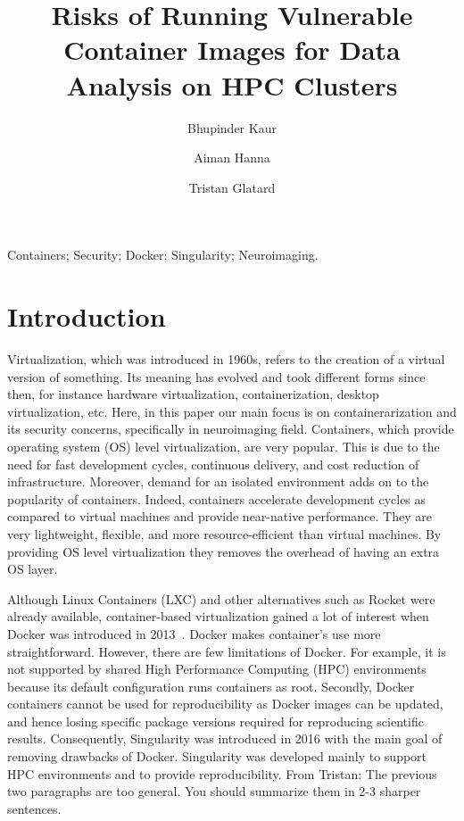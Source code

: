 \documentclass[a4paper,num-refs]{oup-contemporary}
\title{Risks of Running Vulnerable Container Images for Data Analysis on HPC
Clusters}
\newcommand{\TG}[1]{\color{blue}From Tristan: #1\color{black}}
\begin{document}
\author[1]{Bhupinder Kaur}
\author[1]{Aiman Hanna}
\author[1]{Tristan Glatard}


\maketitle

\begin{keywords}
Containers; Security; Docker; Singularity; Neuroimaging.
\end{keywords}


\section{Introduction}

Virtualization, which was introduced in 1960s, refers to the creation of a virtual
version of something. Its meaning has evolved and took different forms since then, for
instance hardware virtualization, containerization, desktop virtualization, etc.
Here, in this paper our main focus is on containerarization and its security concerns,
specifically in neuroimaging field.
Containers, which provide operating system (OS) level virtualization, are very
popular. This is due to the need for fast development cycles, continuous delivery,
and cost reduction of infrastructure. Moreover, demand for an isolated
environment adds on to the popularity of containers. Indeed, containers accelerate
development cycles as compared to virtual machines and provide near-native performance.
They are very lightweight, flexible, and more resource-efficient than virtual
machines. By providing OS level virtualization they
removes the overhead of having an extra OS layer.

Although Linux Containers (LXC) and other alternatives such as Rocket were already
available, container-based virtualization gained a lot of interest when Docker was
introduced in 2013~\cite{gantikow2016providing}. Docker makes container's use more straightforward. However, there
are few limitations of Docker. For example, it is not supported by shared High Performance
Computing (HPC) environments because its default configuration runs containers
as root. Secondly, Docker containers cannot be used for reproducibility as Docker
images can be updated, and hence losing specific package versions required for
reproducing scientific results. Consequently, Singularity was introduced in 2016 with the main
goal of removing drawbacks of Docker. Singularity was developed mainly to
support HPC environments and to provide reproducibility. \TG{The previous two paragraphs are too general. You should
summarize them in 2-3 sharper sentences.}
\end{document}
